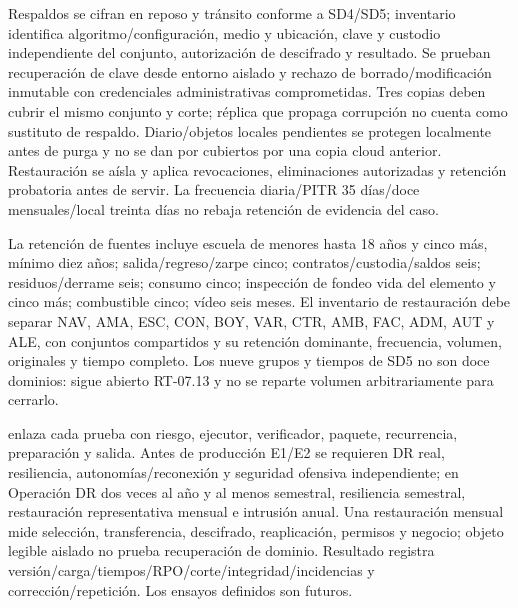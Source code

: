 Respaldos se cifran en reposo y tránsito conforme a SD4/SD5; inventario identifica algoritmo/configuración, medio y ubicación, clave y custodio independiente del conjunto, autorización de descifrado y resultado. Se prueban recuperación de clave desde entorno aislado y rechazo de borrado/modificación inmutable con credenciales administrativas comprometidas. Tres copias deben cubrir el mismo conjunto y corte; réplica que propaga corrupción no cuenta como sustituto de respaldo. Diario/objetos locales pendientes se protegen localmente antes de purga y no se dan por cubiertos por una copia cloud anterior. Restauración se aísla y aplica revocaciones, eliminaciones autorizadas y retención probatoria antes de servir. La frecuencia diaria/PITR 35 días/doce mensuales/local treinta días no rebaja retención de evidencia del caso.

La retención de fuentes incluye escuela de menores hasta 18 años y cinco más, mínimo diez años; salida/regreso/zarpe cinco; contratos/custodia/saldos seis; residuos/derrame seis; consumo cinco; inspección de fondeo vida del elemento y cinco más; combustible cinco; vídeo seis meses. El inventario de restauración debe separar NAV, AMA, ESC, CON, BOY, VAR, CTR, AMB, FAC, ADM, AUT y ALE, con conjuntos compartidos y su retención dominante, frecuencia, volumen, originales y tiempo completo. Los nueve grupos y tiempos de SD5 no son doce dominios: sigue abierto RT-07.13 y no se reparte volumen arbitrariamente para cerrarlo. \parencite[cap.~15, retención RT-05.10, p.~33]{sd8-c07}

 enlaza cada prueba con riesgo, ejecutor, verificador, paquete, recurrencia, preparación y salida. Antes de producción E1/E2 se requieren DR real, resiliencia, autonomías/reconexión y seguridad ofensiva independiente; en Operación DR dos veces al año y al menos semestral, resiliencia semestral, restauración representativa mensual e intrusión anual. Una restauración mensual mide selección, transferencia, descifrado, reaplicación, permisos y negocio; objeto legible aislado no prueba recuperación de dominio. Resultado registra versión/carga/tiempos/RPO/corte/integridad/incidencias y corrección/repetición. Los ensayos definidos son futuros.

